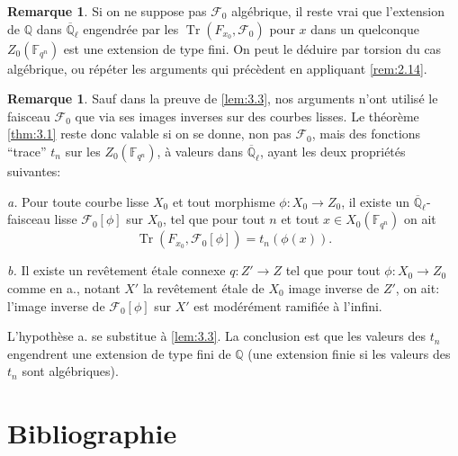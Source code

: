 \documentclass[11pt,a4paper]{article}
\theoremstyle{plain}
\theoremstyle{definition}
\newtheorem{remark}[theorem]{Remarque}
\DeclareMathOperator{\tr}{Tr}
\begin{document}
\begin{remark}\label{rem:3.9}
Si on ne suppose pas $\mathcal{F}_0$ alg\'ebrique, il reste vrai que l'extension de $\mathbb{Q}$ dans $\overline{\mathbb{Q}}_\ell$ engendr\'ee par les $\tr(F_{x_0}, \mathcal{F}_0)$ pour $x$ dans un quelconque $Z_0(\mathbb{F}_{q^n})$ est une extension de type fini. On peut le d\'eduire par torsion du cas alg\'ebrique, ou r\'ep\'eter les arguments qui pr\'ec\`edent en appliquant \ref{rem:2.14}.
\end{remark}

\begin{remark}\label{rem:3.10}
Sauf dans la preuve de \ref{lem:3.3}, nos arguments n'ont utilis\'e le faisceau $\mathcal{F}_0$ que via ses images inverses sur des courbes lisses. Le th\'eor\`eme \ref{thm:3.1} reste donc valable si on se donne, non pas $\mathcal{F}_0$, mais des fonctions ``trace'' $t_n$ sur les $Z_0(\mathbb{F}_{q^n})$, \`a valeurs dans $\overline{\mathbb{Q}}_\ell$, ayant les deux propri\'et\'es suivantes:

\emph{a.} Pour toute courbe lisse $X_0$ et tout morphisme $\phi: X_0 \to Z_0$, il existe un $\overline{\mathbb{Q}}_\ell$-faisceau lisse $\mathcal{F}_0[\phi]$ sur $X_0$, tel que pour tout $n$ et tout $x \in X_0(\mathbb{F}_{q^n})$ on ait
\[
\tr(F_{x_0}, \mathcal{F}_0[\phi]) = t_n(\phi(x)).
\]

\emph{b.} Il existe un rev\^etement \'etale connexe $q: Z' \to Z$ tel que pour tout $\phi: X_0 \to Z_0$ comme en a., notant $X'$ la rev\^etement \'etale de $X_0$ image inverse de $Z'$, on ait: l'image inverse de $\mathcal{F}_0[\phi]$ sur $X'$ est mod\'er\'ement ramifi\'ee \`a l'infini.

L'hypoth\`ese a. se substitue \`a \ref{lem:3.3}. La conclusion est que les valeurs des $t_n$ engendrent une extension de type fini de $\mathbb{Q}$ (une extension finie si les valeurs des $t_n$ sont alg\'ebriques).
\end{remark}

\section*{Bibliographie}
\end{document}
